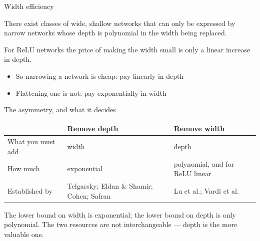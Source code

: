 \documentclass[aspectratio=169, 11pt]{beamer}
\begin{document}
\begin{frame}{Width efficiency}
  \vspace{0.3em}
  \begin{theorem}
    {\small There exist classes of wide, shallow networks that can only
    be expressed by narrow networks whose depth is
    \alert{polynomial} in the width being replaced.}
  \end{theorem}
  \vspace{0.4em}
  \begin{theorem}
    {\small For ReLU networks the price of making the width small is
    only a \alert{linear} increase in depth.}
  \end{theorem}
  \vspace{0.5em}
  {\small
  \begin{itemize}\setlength{\itemsep}{3pt}
    \item So narrowing a network is cheap: pay linearly in depth
    \item Flattening one is not: pay \alert{exponentially} in width
  \end{itemize}}
\end{frame}

\begin{frame}{The asymmetry, and what it decides}
  \vspace{0.05em}
  \centering
  \renewcommand{\arraystretch}{1.4}
  {\small
  \begin{tabular}{p{} p{}
                  p{}}
    & \textbf{\color{dpc}Remove depth}
    & \textbf{\color{shc}Remove width}\\
    \hline
    What you must add & width & depth\\
    How much & \alert{exponential} & \alert{polynomial}, and for ReLU
                                     \alert{linear}\\
    Established by & Telgarsky; Eldan \& Shamir; Cohen; Safran
                   & Lu et al.; Vardi et al.\\
    \hline
  \end{tabular}}
  \vspace{0.05em}
  \begin{redhighlight}
    The lower bound on width is \alert{exponential}; the lower bound on
    depth is only \alert{polynomial}. The two resources are not
    interchangeable --- \alert{depth is the more valuable one.}
  \end{redhighlight}
\end{frame}
\end{document}
